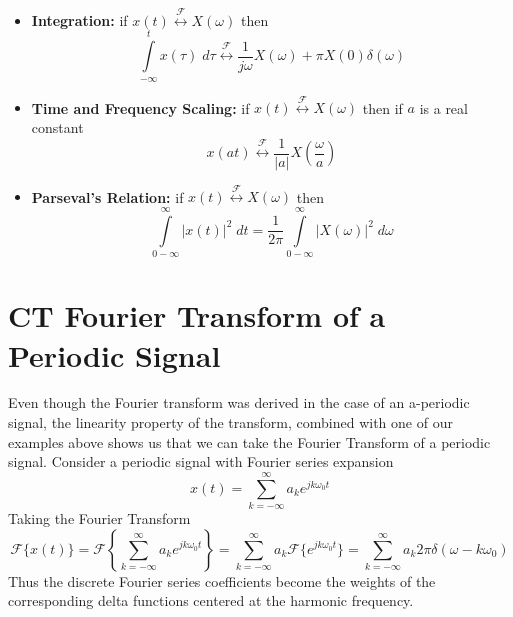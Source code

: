 \begin{itemize}
\item \textbf{Integration:} if $x(t) \stackrel{\mathcal{F}}{\longleftrightarrow} X(\omega)$ then
  \[
  \int\limits_{-\infty}^t x(\tau)\; d\tau \stackrel{\mathcal{F}}{\longleftrightarrow} \frac{1}{j\omega} X(\omega) + \pi X(0) \delta(\omega)
  \]
\item \textbf{Time and Frequency Scaling:} if $x(t) \stackrel{\mathcal{F}}{\longleftrightarrow} X(\omega)$ then if $a$ is a real constant
  \[
  x(at) \stackrel{\mathcal{F}}{\longleftrightarrow} \frac{1}{|a|} X\left(\frac{\omega}{a}\right)
  \]
\item \textbf{Parseval's Relation:} if $x(t) \stackrel{\mathcal{F}}{\longleftrightarrow} X(\omega)$ then
  \[
  \int\limits_{0-\infty}^{\infty} |x(t)|^2\; dt =  \frac{1}{2\pi}\int\limits_{0-\infty}^{\infty} |X(\omega)|^2\;d\omega
  \]
\end{itemize}


\section{CT Fourier Transform of a Periodic Signal}

Even though the Fourier transform was derived in the case of an a-periodic signal, the linearity property of the transform, combined with one of our examples above shows us that we can take the Fourier Transform of a periodic signal. Consider a periodic signal with Fourier series expansion
\[
x(t) = \sum\limits_{k = -\infty}^{\infty} a_k e^{jk\omega_0 t}
\]
Taking the Fourier Transform
\[
\mathcal{F}\{x(t)\} = \mathcal{F}\left\{\sum\limits_{k = -\infty}^{\infty} a_k e^{jk\omega_0 t}\right\} = \sum\limits_{k = -\infty}^{\infty} a_k \mathcal{F}\{e^{jk\omega_0 t}\} = \sum\limits_{k = -\infty}^{\infty} a_k 2\pi \delta(\omega-k\omega_0) 
\]
Thus the discrete Fourier series coefficients become the weights of the corresponding delta functions centered at the harmonic frequency.

